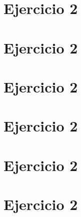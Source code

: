 \documentclass[%
 reprint,
 amsmath,amssymb,
 aps,
]{revtex4-1}
\begin{document}
\section{Ejercicio 2}
\section{Ejercicio 2}
\section{Ejercicio 2}
\section{Ejercicio 2}
\section{Ejercicio 2}
\section{Ejercicio 2}
\end{document}
